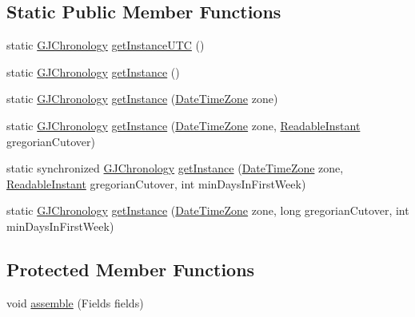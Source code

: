 \subsection*{Static Public Member Functions}
\begin{DoxyCompactItemize}
\item 
static \hyperlink{classorg_1_1joda_1_1time_1_1chrono_1_1_g_j_chronology}{G\-J\-Chronology} \hyperlink{classorg_1_1joda_1_1time_1_1chrono_1_1_g_j_chronology_a30d7beec383fa480bd9d032f9e2d17ab}{get\-Instance\-U\-T\-C} ()
\item 
static \hyperlink{classorg_1_1joda_1_1time_1_1chrono_1_1_g_j_chronology}{G\-J\-Chronology} \hyperlink{classorg_1_1joda_1_1time_1_1chrono_1_1_g_j_chronology_a37bf447920be06d4ff5c389f2c77d921}{get\-Instance} ()
\item 
static \hyperlink{classorg_1_1joda_1_1time_1_1chrono_1_1_g_j_chronology}{G\-J\-Chronology} \hyperlink{classorg_1_1joda_1_1time_1_1chrono_1_1_g_j_chronology_a9dbf35ed052bd0d73a83d2ad24a27089}{get\-Instance} (\hyperlink{classorg_1_1joda_1_1time_1_1_date_time_zone}{Date\-Time\-Zone} zone)
\item 
static \hyperlink{classorg_1_1joda_1_1time_1_1chrono_1_1_g_j_chronology}{G\-J\-Chronology} \hyperlink{classorg_1_1joda_1_1time_1_1chrono_1_1_g_j_chronology_aa2c7e0c5b64281487816cbe8edfca7de}{get\-Instance} (\hyperlink{classorg_1_1joda_1_1time_1_1_date_time_zone}{Date\-Time\-Zone} zone, \hyperlink{interfaceorg_1_1joda_1_1time_1_1_readable_instant}{Readable\-Instant} gregorian\-Cutover)
\item 
static synchronized \hyperlink{classorg_1_1joda_1_1time_1_1chrono_1_1_g_j_chronology}{G\-J\-Chronology} \hyperlink{classorg_1_1joda_1_1time_1_1chrono_1_1_g_j_chronology_a2676ce694d23902b9b5c9a545fc111ff}{get\-Instance} (\hyperlink{classorg_1_1joda_1_1time_1_1_date_time_zone}{Date\-Time\-Zone} zone, \hyperlink{interfaceorg_1_1joda_1_1time_1_1_readable_instant}{Readable\-Instant} gregorian\-Cutover, int min\-Days\-In\-First\-Week)
\item 
static \hyperlink{classorg_1_1joda_1_1time_1_1chrono_1_1_g_j_chronology}{G\-J\-Chronology} \hyperlink{classorg_1_1joda_1_1time_1_1chrono_1_1_g_j_chronology_ac09a7d52492cd06a1141325487bd3cf8}{get\-Instance} (\hyperlink{classorg_1_1joda_1_1time_1_1_date_time_zone}{Date\-Time\-Zone} zone, long gregorian\-Cutover, int min\-Days\-In\-First\-Week)
\end{DoxyCompactItemize}
\subsection*{Protected Member Functions}
\begin{DoxyCompactItemize}
\item 
void \hyperlink{classorg_1_1joda_1_1time_1_1chrono_1_1_g_j_chronology_aed7a6f3184bf88ee5e1b154c534822b1}{assemble} (Fields fields)
\end{DoxyCompactItemize}


